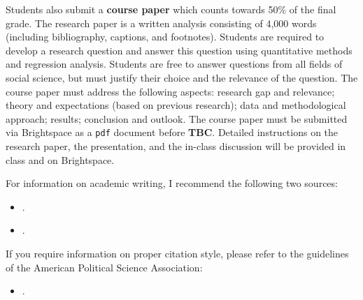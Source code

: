 \documentclass[abstract=on,parskip=full,headings=standardclasses,fontsize=11pt,paper=a4]{scrartcl}
\begin{document}
Students also submit a \textbf{course paper} which counts towards 50\% of the final grade. The research paper is a written analysis consisting of 4,000 words (including bibliography, captions, and footnotes). Students are required to develop a research question and answer this question using quantitative methods and regression analysis. Students are free to answer questions from all fields of social science, but must justify their choice and the relevance of the question. The course paper must address the following aspects: research gap and relevance; theory and expectations (based on previous research); data and methodological approach; results; conclusion and outlook. The course paper must be submitted via Brightspace as a \texttt{pdf} document before \textbf{TBC}.  Detailed instructions on the research paper, the presentation, and the in-class discussion will be provided in class and on Brightspace.

For information on academic writing, I recommend the following two sources:
\begin{itemize}
\item {}.
\item {}.
\end{itemize}

If you require information on proper citation style, please refer to the guidelines of the American Political Science Association:

\begin{itemize}
\item {}.
\end{itemize}
\end{document}
